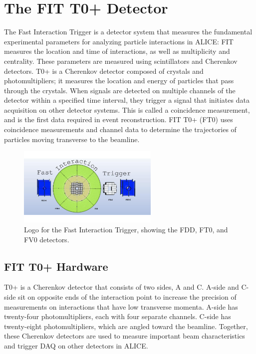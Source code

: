 
\chapter{The FIT T0+ Detector}
The Fast Interaction Trigger is a detector system that measures the fundamental experimental parameters for analyzing particle interactions in ALICE: FIT measures the location and time of interactions, as well as multiplicity and centrality. These parameters are measured using scintillators and Cherenkov detectors. T0+ is a Cherenkov detector composed of crystals and photomultipliers; it measures the location and energy of particles that pass through the crystals. When signals are detected on multiple channels of the detector within a specified time interval, they trigger a signal that initiates data acquisition on other detector systems. This is called a coincidence measurement, and is the first data required in event reconstruction. FIT T0+ (FT0) uses coincidence measurements and channel data to determine the trajectories of particles moving transverse to the beamline.

\begin{figure}[H]
    \centering
    \includegraphics[width=0.6\textwidth]{figures/FIT/FIT_Logo.jpg}
    \caption{Logo for the Fast Interaction Trigger, showing the FDD, FT0, and FV0 detectors.}
    \label{fig:FIT_Logo}
\end{figure}


\section{FIT T0+ Hardware}
T0+ is a Cherenkov detector that consists of two sides, A and C. A-side and C-side sit on opposite ends of the interaction point to increase the precision of measurements on interactions that have low transverse momenta. A-side has twenty-four photomultipliers, each with four separate channels. C-side has twenty-eight photomultipliers, which are angled toward the beamline. Together, these Cherenkov detectors are used to measure important beam characteristics and trigger DAQ on other detectors in ALICE. 

